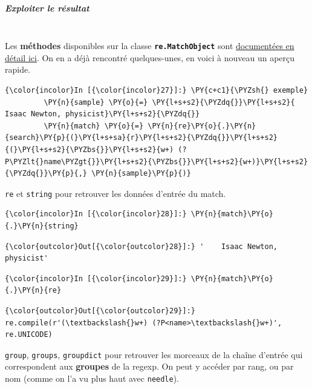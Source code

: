     \hypertarget{exploiter-le-ruxe9sultat}{%
\subparagraph{Exploiter le résultat\\\\}\label{exploiter-le-ruxe9sultat}}

    Les \textbf{méthodes} disponibles sur la classe
\textbf{\texttt{re.MatchObject}} sont
\href{https://docs.python.org/3/library/re.html\#match-objects}{documentées
en détail ici}. On en a déjà rencontré quelques-unes, en voici à nouveau
un aperçu rapide.

    \begin{Verbatim}[commandchars=\\\{\}]
{\color{incolor}In [{\color{incolor}27}]:} \PY{c+c1}{\PYZsh{} exemple}
         \PY{n}{sample} \PY{o}{=} \PY{l+s+s2}{\PYZdq{}}\PY{l+s+s2}{    Isaac Newton, physicist}\PY{l+s+s2}{\PYZdq{}}
         \PY{n}{match} \PY{o}{=} \PY{n}{re}\PY{o}{.}\PY{n}{search}\PY{p}{(}\PY{l+s+sa}{r}\PY{l+s+s2}{\PYZdq{}}\PY{l+s+s2}{(}\PY{l+s+s2}{\PYZbs{}}\PY{l+s+s2}{w+) (?P\PYZlt{}name\PYZgt{}}\PY{l+s+s2}{\PYZbs{}}\PY{l+s+s2}{w+)}\PY{l+s+s2}{\PYZdq{}}\PY{p}{,} \PY{n}{sample}\PY{p}{)}
\end{Verbatim}


    \texttt{re} et \texttt{string} pour retrouver les données d'entrée du
match.

    \begin{Verbatim}[commandchars=\\\{\}]
{\color{incolor}In [{\color{incolor}28}]:} \PY{n}{match}\PY{o}{.}\PY{n}{string}
\end{Verbatim}


\begin{Verbatim}[commandchars=\\\{\}]
{\color{outcolor}Out[{\color{outcolor}28}]:} '    Isaac Newton, physicist'
\end{Verbatim}
            
    \begin{Verbatim}[commandchars=\\\{\}]
{\color{incolor}In [{\color{incolor}29}]:} \PY{n}{match}\PY{o}{.}\PY{n}{re}
\end{Verbatim}


\begin{Verbatim}[commandchars=\\\{\}]
{\color{outcolor}Out[{\color{outcolor}29}]:} re.compile(r'(\textbackslash{}w+) (?P<name>\textbackslash{}w+)', re.UNICODE)
\end{Verbatim}
            
    \texttt{group}, \texttt{groups}, \texttt{groupdict} pour retrouver les
morceaux de la chaîne d'entrée qui correspondent aux \textbf{groupes} de
la regexp. On peut y accéder par rang, ou par nom (comme on l'a vu plus
haut avec \texttt{needle}).

